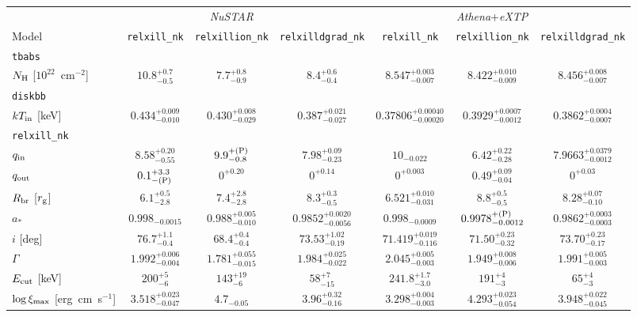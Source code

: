 \documentclass[twocolumn]{emulateapj}
\begin{document}
\begin{table*}
\centering
{\renewcommand{\arraystretch}{1.3}
\begin{tabular}{lccc|ccc}
\hline\hline
&& \textsl{NuSTAR} &&& \textsl{Athena}+\textsl{eXTP} & \\
Model & {\tt relxill\_nk} & {\tt relxillion\_nk} & {\tt relxilldgrad\_nk} & {\tt relxill\_nk} & {\tt relxillion\_nk} & {\tt relxilldgrad\_nk} \\
\hline\hline
{\tt tbabs} \\
$N_{\rm H}$ [$10^{22}$~cm$^{-2}$] & $10.8_{-0.5}^{+0.7}$ & $7.7_{-0.9}^{+0.8}$ & $8.4_{-0.4}^{+0.6}$ & $8.547_{-0.007}^{+0.003}$ & $8.422_{-0.009}^{+0.010}$ & $8.456_{-0.007}^{+0.008}$ \\
\hline 
{\tt diskbb} \\
$kT_{\rm in}$ [keV] & $0.434_{-0.010}^{+0.009}$ & $0.430_{-0.029}^{+0.008}$ & $0.387_{-0.027}^{+0.021}$ & $0.37806_{-0.00020}^{+0.00040}$ & $0.3929_{-0.0012}^{+0.0007}$ & $0.3862_{-0.0007}^{+0.0004}$ \\
\hline
{\tt relxill\_nk} \\
$q_{\rm in}$ & $8.58_{-0.55}^{+0.20}$ & $9.9_{-0.8}^{\rm + (P)}$ & $7.98_{-0.23}^{+0.09}$ & $10_{-0.022}$ & $6.42_{-0.28}^{+0.22}$ & $7.9663_{-0.0012}^{+0.0379}$ \\
$q_{\rm out}$ & $0.1_{\rm -(P)}^{+3.3}$ & $0_{}^{+0.20}$ & $0_{}^{+0.14}$ & $0^{+0.003}$ & $0.49_{-0.04}^{+0.09}$ & $0^{+0.03}$ \\
$R_{\rm br}$ [$r_{\rm g}$] & $6.1_{-2.8}^{+0.5}$ & $7.4_{-2.8}^{+2.8}$ & $8.3_{-0.5}^{+0.3}$ & $6.521_{-0.031}^{+0.010}$ & $8.8_{-0.5}^{+0.5}$ & $8.28_{-0.10}^{+0.07}$ \\
$a_*$ & $0.998_{-0.0015}^{}$ & $0.988_{-0.010}^{+0.005}$ & $0.9852_{-0.0056}^{+0.0020}$ & $0.998_{-0.0009}$ & $0.9978_{-0.0012}^{\rm +(P)}$ & $0.9862_{-0.0003}^{+0.0003}$ \\
$i$ [deg] & $76.7_{-0.4}^{+1.1}$ & $68.4_{-0.4}^{+0.4}$ & $73.53_{-0.19}^{+1.02}$ & $71.419_{-0.116}^{+0.019}$ & $71.50_{-0.32}^{+0.23}$ & $73.70_{-0.17}^{+0.23}$ \\
$\Gamma$ & $1.992_{-0.004}^{+0.006}$ & $1.781_{-0.015}^{+0.055}$ & $1.984_{-0.022}^{+0.025}$ & $2.045_{-0.003}^{+0.005}$ & $1.949_{-0.006}^{+0.008}$ & $1.991_{-0.003}^{+0.005}$ \\
$E_{\rm cut}$ [keV] & $200_{-6}^{+5}$ & $143_{-6}^{+19}$ & $58_{-15}^{+7}$ & $241.8_{-3.0}^{+1.7}$ & $191_{-3}^{+4}$ & $65_{-3}^{+4}$ \\
$\log\xi_{\rm max}$ [erg~cm~s$^{-1}$] & $3.518_{-0.047}^{+0.023}$ & $4.7_{-0.05}^{}$ & $3.96_{-0.16}^{+0.32}$ & $3.298_{-0.003}^{+0.004}$ & $4.293_{-0.054}^{+0.023}$ & $3.948_{-0.045}^{+0.022}$ \\

\end{tabular}}
\end{table*}
\end{document}
